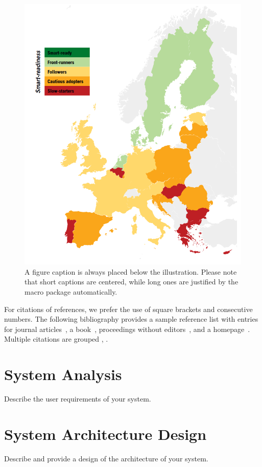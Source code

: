 \documentclass[runningheads]{llncs}
\begin{document}
\begin{figure}
\includegraphics[width=\textwidth]{fig1}
\caption{A figure caption is always placed below the illustration.
Please note that short captions are centered, while long ones are
justified by the macro package automatically.} \label{fig1}
\end{figure}

For citations of references, we prefer the use of square brackets
and consecutive numbers. The following bibliography provides
a sample reference list with entries for journal
articles~\cite{ref_article1}, a book~\cite{ref_book1}, proceedings without editors~\cite{ref_proc1},
and a homepage~\cite{ref_url1}. Multiple citations are grouped
\cite{ref_article1,ref_book1},
\cite{ref_article1,ref_book1,ref_proc1,ref_url1}.

\section{System Analysis}
Describe the user requirements of your system.

\section{System Architecture Design}
Describe and provide a design of the architecture of your system.
\end{document}
